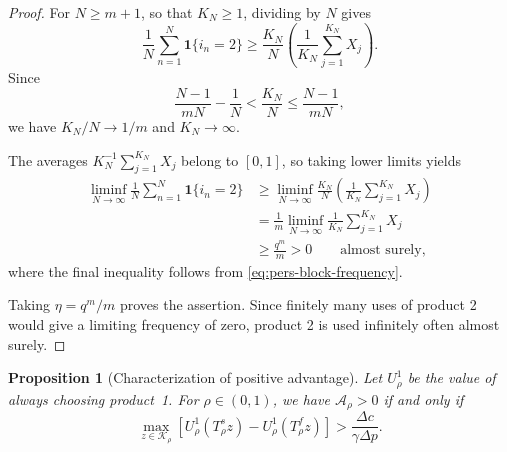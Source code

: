\documentclass[11pt]{article}
\newtheorem{proposition}{Proposition}
\begin{document}
\begin{proof}
For $N\ge m+1$, so that $K_N\ge1$, dividing by $N$ gives
\begin{equation*}
\frac{1}{N}\sum_{n=1}^{N}\mathbf 1\{i_n=2\}
\ge
\frac{K_N}{N}
\left(
\frac{1}{K_N}\sum_{j=1}^{K_N}X_j
\right).
\end{equation*}
Since
\begin{equation*}
\frac{N-1}{mN}-\frac{1}{N}
<
\frac{K_N}{N}
\le
\frac{N-1}{mN},
\end{equation*}
we have $K_N/N\to1/m$ and $K_N\to\infty$.

The averages
$K_N^{-1}\sum_{j=1}^{K_N}X_j$ belong to $[0,1]$,
so taking lower limits yields
\begin{equation*}
\begin{aligned}
\liminf_{N\to\infty}
\frac{1}{N}\sum_{n=1}^{N}\mathbf 1\{i_n=2\}
&\ge
\liminf_{N\to\infty}
\frac{K_N}{N}
\left(
\frac{1}{K_N}\sum_{j=1}^{K_N}X_j
\right)\\
&=
\frac{1}{m}
\liminf_{N\to\infty}
\frac{1}{K_N}\sum_{j=1}^{K_N}X_j\\
&\ge
\frac{q^m}{m}>0
\qquad\text{almost surely},
\end{aligned}
\end{equation*}
where the final inequality follows from
\eqref{eq:pers-block-frequency}.

Taking $\eta=q^m/m$ proves the assertion.
Since finitely many uses of product 2 would give a limiting
frequency of zero, product 2 is used infinitely often
almost surely.
\end{proof}

\begin{proposition}[Characterization of positive advantage]
\label{prop:positive-characterization}
Let $U^{1}_\rho$ be the value of always choosing product~1.
For $\rho\in(0,1)$, we have $\mathcal A_\rho>0$ if and only if
\begin{equation}
\max_{z\in\mathcal K_\rho}
\left[U_\rho^1(T_\rho^s z)-U_\rho^1(T_\rho^f z)\right]
>\frac{\Delta c}{\gamma\Delta p}.
\end{equation}
\end{proposition}
\end{document}
